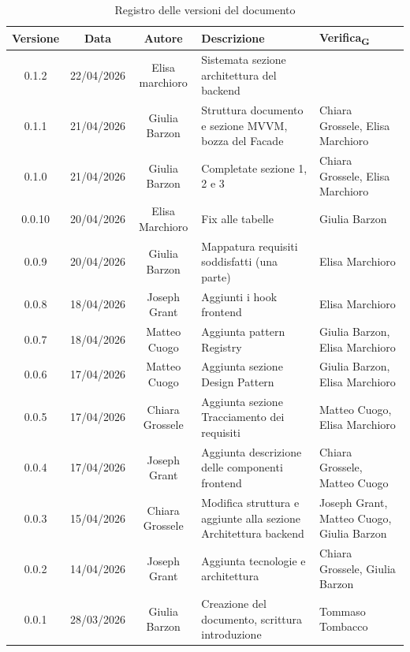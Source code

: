 \documentclass[11pt,a4paper]{article}
\newcommand{\gls}[1]{#1\textsubscript{G}}
\begin{document}
\begin{table}[H]
    \centering          
    \begin{tabular}{|c|c|c|>{\raggedright\arraybackslash}p{}|p{}|}
        \hline
        \textbf{Versione} & \textbf{Data} & \textbf{Autore} & \textbf{Descrizione} & \textbf{\gls{Verifica}} \\
        \hline
        0.1.2 & 22/04/2026 & Elisa marchioro & Sistemata sezione architettura del backend & \\
        \hline
        0.1.1 & 21/04/2026 & Giulia Barzon & Struttura documento e sezione MVVM, bozza del Facade & Chiara Grossele, Elisa Marchioro\\
        \hline
        0.1.0 & 21/04/2026 & Giulia Barzon & Completate sezione 1, 2 e 3 & Chiara Grossele, Elisa Marchioro\\
        \hline
        0.0.10 & 20/04/2026 & Elisa Marchioro & Fix alle tabelle & Giulia Barzon\\
        \hline
        0.0.9 & 20/04/2026 & Giulia Barzon & Mappatura requisiti soddisfatti (una parte) & Elisa Marchioro\\
        \hline
        0.0.8 & 18/04/2026 & Joseph Grant & Aggiunti i hook frontend & Elisa Marchioro\\
        \hline
        0.0.7 & 18/04/2026 & Matteo Cuogo & Aggiunta pattern Registry & Giulia Barzon, Elisa Marchioro\\
        \hline
        0.0.6 & 17/04/2026 & Matteo Cuogo & Aggiunta sezione Design Pattern & Giulia Barzon, Elisa Marchioro\\
        \hline
        0.0.5 & 17/04/2026 & Chiara Grossele & Aggiunta sezione Tracciamento dei requisiti & Matteo Cuogo, Elisa Marchioro\\
        \hline
        0.0.4 & 17/04/2026 & Joseph Grant & Aggiunta descrizione delle componenti frontend & Chiara Grossele, Matteo Cuogo\\
        \hline
        0.0.3 & 15/04/2026 & Chiara Grossele & Modifica struttura e aggiunte alla sezione Architettura backend & Joseph Grant, Matteo Cuogo, Giulia Barzon \\
        \hline
        0.0.2 & 14/04/2026 & Joseph Grant & Aggiunta tecnologie e architettura & Chiara Grossele, Giulia Barzon\\
        \hline
        0.0.1 & 28/03/2026 & Giulia Barzon & Creazione del documento, scrittura introduzione & Tommaso Tombacco \\
        \hline
    \end{tabular}
    \caption{Registro delle versioni del documento}
    \label{tab:versionamento}
\end{table}
\newpage
\end{document}
